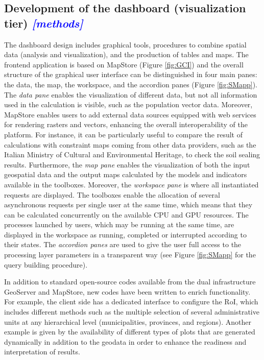 \documentclass[APA,LATO1COL,doublespace]{WileyNJD-v2}
\newcommand{\update}[1]{\emph{\textcolor{blue}{#1}}}     %
\begin{document}
\subsection{Development of the dashboard (visualization tier) \update{[methods]}}\label{sec:viewTier}
The dashboard design includes graphical tools, procedures to combine spatial data (analysis and visualization), and the production of tables and maps. 
The frontend application is based on MapStore (Figure \ref{fig:GCI}) and the overall structure of the graphical user interface can be distinguished in four main panes: the data, the map, the workspace, and the accordion panes (Figure \ref{fig:SMapp}).
The \textit{data pane} enables the visualization of different data, but not all information used in the calculation is visible, such as the population vector data. 
Moreover, MapStore enables users to add external data sources equipped with web services for rendering rasters and vectors, enhancing the overall interoperability of the platform. 
For instance, it can be particularly useful to compare the result of calculations with constraint maps coming from other data providers, such as the Italian Ministry of Cultural and Environmental Heritage, to check the soil sealing results. Furthermore, the \textit{map pane} enables the visualization of both the input geospatial data and the output maps calculated by the models and indicators available in the toolboxes. 
Moreover, the \textit{workspace pane} is where all instantiated requests are displayed. 
The toolboxes enable the allocation of several asynchronous requests per single user at the same time, which means that they can be calculated concurrently on the available CPU and GPU resources. 
The processes launched by users, which may be running at the same time, are displayed in the workspace as running, completed or interrupted according to their states. 
The \textit{accordion panes} are used to give the user full access to the processing layer parameters in a transparent way (see Figure \ref{fig:SMapp} for the query building procedure).

In addition to standard open-source codes available from the dual infrastructure GeoServer and MapStore, new codes have been written to enrich functionality. 
For example, the client side has a dedicated interface to configure the RoI, which includes different methods such as the multiple selection of several administrative units at any hierarchical level (municipalities, provinces, and regions). 
Another example is given by the availability of different types of plots that are generated dynamically in addition to the geodata in order to enhance the readiness and interpretation of results.
\end{document}
